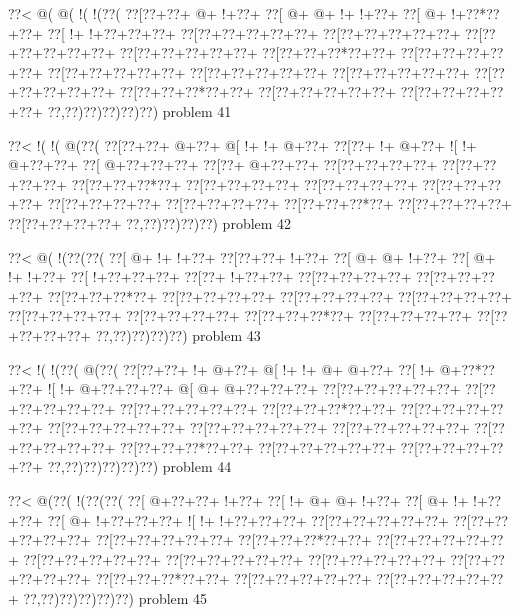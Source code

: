 \vbox{\vbox{\goo
\0??<\- @(\- @(\- !(\- !(\0??(
\0??[\0??+\0??+\- @+\- !+\0??+
\0??[\- @+\- @+\- !+\- !+\0??+
\0??[\- @+\- !+\0??*\0??+\0??+
\0??[\- !+\- !+\0??+\0??+\0??+
\0??[\0??+\0??+\0??+\0??+\0??+
\0??[\0??+\0??+\0??+\0??+\0??+
\0??[\0??+\0??+\0??+\0??+\0??+
\0??[\0??+\0??+\0??+\0??+\0??+
\0??[\0??+\0??+\0??*\0??+\0??+
\0??[\0??+\0??+\0??+\0??+\0??+
\0??[\0??+\0??+\0??+\0??+\0??+
\0??[\0??+\0??+\0??+\0??+\0??+
\0??[\0??+\0??+\0??+\0??+\0??+
\0??[\0??+\0??+\0??+\0??+\0??+
\0??[\0??+\0??+\0??*\0??+\0??+
\0??[\0??+\0??+\0??+\0??+\0??+
\0??[\0??+\0??+\0??+\0??+\0??+
\0??,\0??)\0??)\0??)\0??)\0??)
}
\hfil problem 41\hfil\break
}

\vbox{\vbox{\goo
\0??<\- !(\- !(\- @(\0??(
\0??[\0??+\0??+\- @+\0??+
\- @[\- !+\- !+\- @+\0??+
\0??[\0??+\- !+\- @+\0??+
\- ![\- !+\- @+\0??+\0??+
\0??[\- @+\0??+\0??+\0??+
\0??[\0??+\- @+\0??+\0??+
\0??[\0??+\0??+\0??+\0??+
\0??[\0??+\0??+\0??+\0??+
\0??[\0??+\0??+\0??*\0??+
\0??[\0??+\0??+\0??+\0??+
\0??[\0??+\0??+\0??+\0??+
\0??[\0??+\0??+\0??+\0??+
\0??[\0??+\0??+\0??+\0??+
\0??[\0??+\0??+\0??+\0??+
\0??[\0??+\0??+\0??*\0??+
\0??[\0??+\0??+\0??+\0??+
\0??[\0??+\0??+\0??+\0??+
\0??,\0??)\0??)\0??)\0??)
}
\hfil problem 42\hfil\break
}

\vbox{\vbox{\goo
\0??<\- @(\- !(\0??(\0??(
\0??[\- @+\- !+\- !+\0??+
\0??[\0??+\0??+\- !+\0??+
\0??[\- @+\- @+\- !+\0??+
\0??[\- @+\- !+\- !+\0??+
\0??[\- !+\0??+\0??+\0??+
\0??[\0??+\- !+\0??+\0??+
\0??[\0??+\0??+\0??+\0??+
\0??[\0??+\0??+\0??+\0??+
\0??[\0??+\0??+\0??*\0??+
\0??[\0??+\0??+\0??+\0??+
\0??[\0??+\0??+\0??+\0??+
\0??[\0??+\0??+\0??+\0??+
\0??[\0??+\0??+\0??+\0??+
\0??[\0??+\0??+\0??+\0??+
\0??[\0??+\0??+\0??*\0??+
\0??[\0??+\0??+\0??+\0??+
\0??[\0??+\0??+\0??+\0??+
\0??,\0??)\0??)\0??)\0??)
}
\hfil problem 43\hfil\break
}

\vbox{\vbox{\goo
\0??<\- !(\- !(\0??(\- @(\0??(
\0??[\0??+\0??+\- !+\- @+\0??+
\- @[\- !+\- !+\- @+\- @+\0??+
\0??[\- !+\- @+\0??*\0??+\0??+
\- ![\- !+\- @+\0??+\0??+\0??+
\- @[\- @+\- @+\0??+\0??+\0??+
\0??[\0??+\0??+\0??+\0??+\0??+
\0??[\0??+\0??+\0??+\0??+\0??+
\0??[\0??+\0??+\0??+\0??+\0??+
\0??[\0??+\0??+\0??*\0??+\0??+
\0??[\0??+\0??+\0??+\0??+\0??+
\0??[\0??+\0??+\0??+\0??+\0??+
\0??[\0??+\0??+\0??+\0??+\0??+
\0??[\0??+\0??+\0??+\0??+\0??+
\0??[\0??+\0??+\0??+\0??+\0??+
\0??[\0??+\0??+\0??*\0??+\0??+
\0??[\0??+\0??+\0??+\0??+\0??+
\0??[\0??+\0??+\0??+\0??+\0??+
\0??,\0??)\0??)\0??)\0??)\0??)
}
\hfil problem 44\hfil\break
}

\vbox{\vbox{\goo
\0??<\- @(\0??(\- !(\0??(\0??(
\0??[\- @+\0??+\0??+\- !+\0??+
\0??[\- !+\- @+\- @+\- !+\0??+
\0??[\- @+\- !+\- !+\0??+\0??+
\0??[\- @+\- !+\0??+\0??+\0??+
\- ![\- !+\- !+\0??+\0??+\0??+
\0??[\0??+\0??+\0??+\0??+\0??+
\0??[\0??+\0??+\0??+\0??+\0??+
\0??[\0??+\0??+\0??+\0??+\0??+
\0??[\0??+\0??+\0??*\0??+\0??+
\0??[\0??+\0??+\0??+\0??+\0??+
\0??[\0??+\0??+\0??+\0??+\0??+
\0??[\0??+\0??+\0??+\0??+\0??+
\0??[\0??+\0??+\0??+\0??+\0??+
\0??[\0??+\0??+\0??+\0??+\0??+
\0??[\0??+\0??+\0??*\0??+\0??+
\0??[\0??+\0??+\0??+\0??+\0??+
\0??[\0??+\0??+\0??+\0??+\0??+
\0??,\0??)\0??)\0??)\0??)\0??)
}
\hfil problem 45\hfil\break
}

